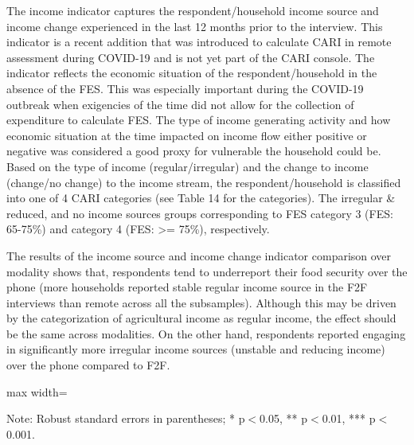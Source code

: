 \documentclass[11pt,harvard]{article}
\begin{document}
The income indicator captures the respondent/household income source and income change experienced in the last 12 months prior to the interview. This indicator is a recent addition that was introduced to calculate CARI in remote assessment during COVID-19 and is not yet part of the CARI console. The indicator reflects the economic situation of the respondent/household in the absence of the FES. This was especially important during the COVID-19 outbreak when exigencies of the time did not allow for the collection of expenditure to calculate FES. The type of income generating activity and how economic situation at the time impacted on income flow either positive or negative was considered a good proxy for vulnerable the household could be. Based on the type of income (regular/irregular) and the change to income (change/no change) to the income stream, the respondent/household is classified into one of 4 CARI categories (see Table 14 for the categories). The irregular \& reduced, and no income sources groups corresponding to FES category 3 (FES: 65-75\%) and category 4 (FES: >= 75\%), respectively.

The results of the income source and income change indicator comparison over modality shows that, respondents tend to underreport their food security over the phone (more households reported stable regular income source in the F2F interviews than remote across all the subsamples). Although this may be driven by the categorization of agricultural income as regular income, the effect should be the same across modalities. On the other hand, respondents reported engaging in significantly more irregular income sources (unstable and reducing income) over the phone compared to F2F. 

	\begin{table}[htbp]
		\centering
		\begin{adjustbox}{max width=\textwidth}
			\begin{threeparttable}
				\caption{Impact of Survey Modality on Income}
				\scriptsize
				 
				\label{tab:INC_Modality_CAR}
				\begin{tablenotes}
					\item Note: Robust standard errors in parentheses; * p$<$0.05, ** p$<$0.01, *** p$<$0.001.
				\end{tablenotes}
			\end{threeparttable}
		\end{adjustbox}
	\end{table}
\end{document}

